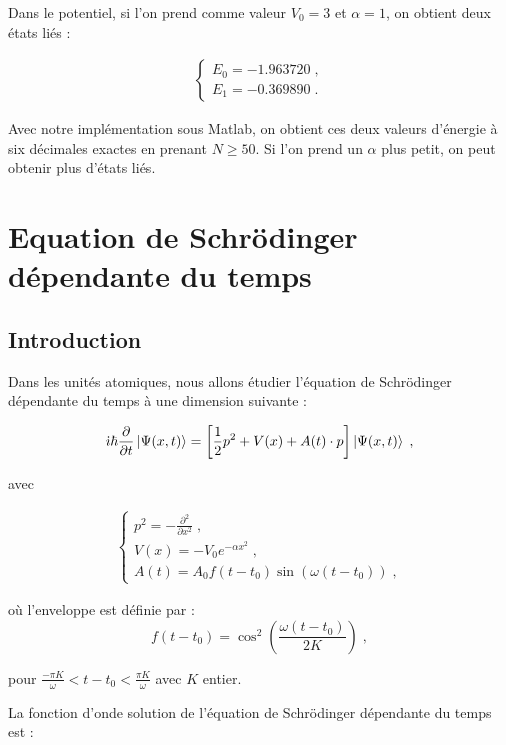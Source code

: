 \documentclass{report}
\begin{document}
Dans le potentiel, si l'on prend comme valeur $V_{0} = 3$ et $\alpha = 1$, on obtient deux états liés :

\begin{align}
\begin{cases}
E_{0} = -1.963720\;, \\
E_{1} = -0.369890\;.
\end{cases}
\end{align}

Avec notre implémentation sous Matlab, on obtient ces deux valeurs d'énergie à six décimales exactes en prenant $N \geq 50$. Si l'on prend un $\alpha$ plus petit, on peut obtenir plus d'états liés.

\section{Equation de Schrödinger dépendante du temps}

\subsection{Introduction}

Dans les unités atomiques, nous allons étudier l'équation de Schrödinger dépendante du temps à une dimension suivante :

\begin{equation}\label{eq:schdt}
\dot{\imath}\hbar\frac{\partial}{\partial t}\ket{\Psi(x,t)}=\left[\frac{1}{2}p^2+ V(x)+A(t)\cdot p\right]\ket{\Psi(x,t)}\;,
\end{equation}

avec

\begin{align}
\begin{cases}
p^{2}=-\frac{\partial^2}{\partial x^{2}}\;,\\
V(x)= -V_{0}e^{-\alpha x^{2}}\;, \\
A(t)= A_{0}f(t-t_{0})\sin(\omega (t-t_{0}))\;,
  \end{cases}
\end{align}

où l'enveloppe est définie par :
\begin{equation}
f(t-t_{0})=\cos^{2} \left(\frac{\omega (t-t_{0})}{2K}\right)\;,
\end{equation}

pour $\frac{-\pi K}{\omega}<t-t_{0}<\frac{\pi K}{\omega}$ avec $K$ entier.

La fonction d'onde solution de l'équation de Schrödinger dépendante du temps est :
\end{document}
